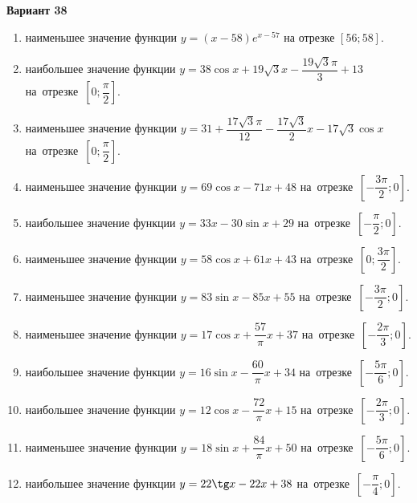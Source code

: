 \documentclass[a4paper,10pt]{article}
\begin{document}
\begin{center}\Large\textbf{Вариант 38}\end{center}

\begin{enumerate}
\item {} наименьшее значение функции $y = \left(x-58\right)e^{x-57}$ на отрезке $\left[56;58\right]$.

\item {} наибольшее значение функции $y = 38\cos x+19\sqrt{3}x-\dfrac{19\sqrt{3}\pi}{3} +13$ на~отрезке~$\left[0;\dfrac{\pi }{2}\right]$.

\item {} наименьшее значение функции $y = 31+\dfrac{17\sqrt{3} \pi}{12}-\dfrac{17\sqrt{3}}{2}x-17\sqrt{3}\cos x$ на~отрезке~$\left[0;\dfrac{\pi }{2}\right]$.

\item {} наименьшее значение функции $y = 69\cos x-71x+48$ на~отрезке~$\left[-\dfrac{3\pi }{2};0\right]$.

\item {} наибольшее значение функции $y = 33x-30\sin x+29$ на~отрезке~$\left[-\dfrac{\pi }{2};0\right]$.

\item {} наименьшее значение функции $y = 58\cos x+61x+43$ на~отрезке~$\left[0;\dfrac{3\pi }{2}\right]$.

\item {} наименьшее значение функции $y = 83\sin x-85x+55$ на~отрезке~$\left[-\dfrac{3\pi }{2};0\right]$.

\item {} наименьшее значение функции $y = 17\cos x+\dfrac{57}{\pi }x +37$ на~отрезке~$\left[-\dfrac{2\pi }{3};0\right]$.

\item {} наибольшее значение функции $y = 16\sin x-\dfrac{60}{\pi }x+34$ на~отрезке~$\left[-\dfrac{5\pi }{6};0\right]$.

\item {} наибольшее значение функции $y = 12\cos x-\dfrac{72}{\pi }x+15$ на~отрезке~$\left[-\dfrac{2\pi }{3};0\right]$.

\item {} наименьшее значение функции $y = 18\sin x+\dfrac{84}{\pi }x+50$ на~отрезке~$\left[-\dfrac{5\pi }{6};0\right]$.

\item {} наибольшее значение функции $y = 22\tg x-22x+38$ на~отрезке~$\left[-\dfrac{\pi }{4};0\right]$.


\end{enumerate}
\end{document}
